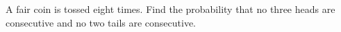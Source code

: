 A fair coin is tossed eight times. Find the probability that no three heads are consecutive and no two tails are consecutive.
